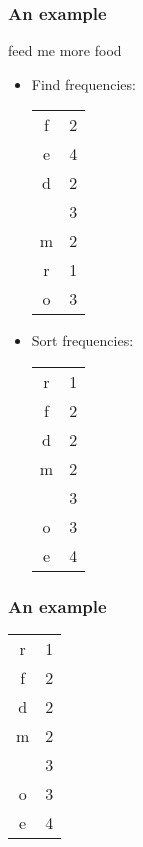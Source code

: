 \documentclass[table]{beamer}
\begin{document}
    \begin{frame}
        \frametitle{An example}
        feed me more food

        \begin{itemize}
            \item<2-> Find frequencies:

                {\scriptsize
                \begin{tabular}{c|c}
                    f & 2\\
                    e & 4\\
                    d & 2\\
                    \textvisiblespace  & 3\\
                    m & 2\\
                    r & 1\\
                    o & 3\\
                \end{tabular}
                }
            \item <3-> Sort frequencies:

                {\scriptsize
                \begin{tabular}{c|c}
                    r & 1\\
                    f & 2\\
                    d & 2\\
                    m & 2\\
                    \textvisiblespace  & 3\\
                    o & 3\\
                    e & 4\\
                \end{tabular}
                }
        \end{itemize}
    \end{frame}
    \begin{frame}
        \frametitle{An example}
            \begin{tabular}{c|c}
                r & 1\\
                f & 2\\
                d & 2\\
                m & 2\\
                \textvisiblespace  & 3\\
                o & 3\\
                e & 4\\
            \end{tabular}
    \end{frame}
\end{document}
